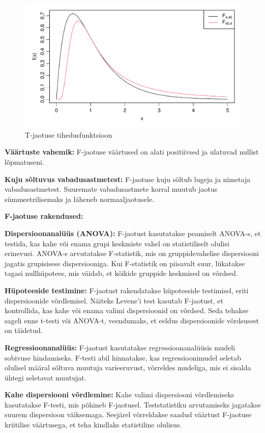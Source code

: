 \documentclass[
]{book}
\theoremstyle{definition}
\theoremstyle{definition}
\theoremstyle{definition}
\theoremstyle{definition}
\theoremstyle{remark}
\begin{document}
\begin{figure}[H]
\includegraphics[width=0.8\linewidth]{_main_files/figure-latex/unnamed-chunk-39-1} \caption{T-jaotuse tihedusfunktsioon}\label{fig:unnamed-chunk-39}
\end{figure}

\textbf{Väärtuste vahemik:} F-jaotuse väärtused on alati positiivsed ja ulatuvad nullist lõpmatuseni.

\textbf{Kuju sõltuvus vabadusastmetest:} F-jaotuse kuju sõltub lugeja ja nimetaja vabadusastmetest. Suuremate vabadusastmete korral muutub jaotus sümmeetrilisemaks ja läheneb normaaljaotusele.

\textbf{F-jaotuse rakendused:}

\textbf{Dispersioonanalüüs (ANOVA):} F-jaotust kasutatakse peamiselt ANOVA-s, et testida, kas kahe või enama grupi keskmiste vahel on statistiliselt olulisi erinevusi. ANOVA-s arvutatakse F-statistik, mis on gruppidevahelise dispersiooni jagatis grupisisese dispersiooniga. Kui F-statistik on piisavalt suur, lükatakse tagasi nullhüpotees, mis väidab, et kõikide gruppide keskmised on võrdsed.

\textbf{Hüpoteeside testimine:} F-jaotust rakendatakse hüpoteeside testimisel, eriti dispersioonide võrdlemisel. Näiteks Levene'i test kasutab F-jaotust, et kontrollida, kas kahe või enama valimi dispersioonid on võrdsed. Seda tehakse sageli enne t-testi või ANOVA-t, veendumaks, et eeldus dispersioonide võrdsusest on täidetud.

\textbf{Regressioonanalüüs:} F-jaotust kasutatakse regressioonanalüüsis mudeli sobivuse hindamiseks. F-testi abil hinnatakse, kas regressioonimudel seletab olulisel määral sõltuva muutuja varieeruvust, võrreldes mudeliga, mis ei sisalda ühtegi seletavat muutujat.

\textbf{Kahe dispersiooni võrdlemine:} Kahe valimi dispersiooni võrdlemiseks kasutatakse F-testi, mis põhineb F-jaotusel. Teststatistiku arvutamiseks jagatakse suurem dispersioon väiksemaga. Seejärel võrreldakse saadud väärtust F-jaotuse kriitilise väärtusega, et teha kindlaks statistiline olulisus.
\end{document}
